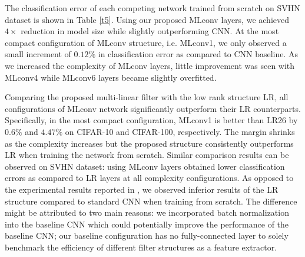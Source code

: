 \documentclass[conference,usletter]{IEEEtran}
\begin{document}
The classification error of each competing network trained from scratch on SVHN dataset is shown in Table \ref{t5}. Using our proposed MLconv layers, we achieved $4\times$ reduction in model size while slightly outperforming CNN. At the most compact configuration of MLconv structure, i.e. MLconv1, we only observed a small increment of $0.12\%$ in classification error as compared to CNN baseline. As we increased the complexity of MLconv layers, little improvement was seen with MLconv4 while MLconv6 layers became slightly overfitted. 



Comparing the proposed multi-linear filter with the low rank structure LR, all configurations of MLconv network significantly outperform their LR counterparts. Specifically, in the most compact configuration, MLconv1 is better than LR26 by $0.6\%$ and $4.47\%$ on CIFAR-10 and CIFAR-100, respectively. The margin shrinks as the complexity increases but the proposed structure consistently outperforms LR when training the network from scratch. Similar comparison results can be observed on SVHN dataset: using MLconv layers obtained lower classification errors as compared to LR layers at all complexity configurations. As opposed to the experimental results reported in \cite{tai2015convolutional}, we observed inferior results of the LR structure compared to standard CNN when training from scratch. The difference might be attributed to two main reasons: we incorporated batch normalization into the baseline CNN which could potentially improve the performance of the baseline CNN; our baseline configuration has no fully-connected layer to solely benchmark the efficiency of different filter structures as a feature extractor. 

\begin{table}[t!]
	\begin{center}
		\caption{SVHN Classification error}\label{t5}
	\end{center}
\end{table}
\end{document}
